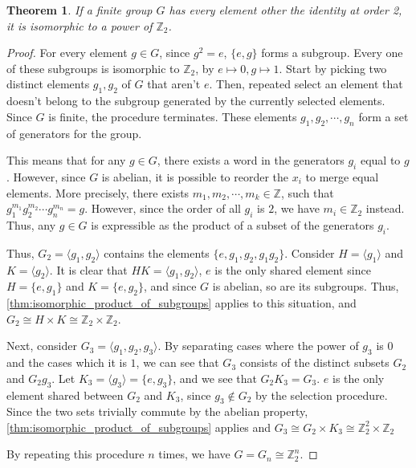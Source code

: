 \documentclass{article}
\newtheorem{theorem}{Theorem}[section]
\begin{document}
\begin{theorem}
    If a finite group $G$ has every element other the identity at order 2,
    it is isomorphic to a power of $\mathbb{Z}_2$.
\end{theorem}
\begin{proof}
    For every element $g \in G$, since $g^{2} = e$, $\{e,g\}$ forms a subgroup.
    Every one of these subgroups is isomorphic to $\mathbb{Z}_{2}$, by $e \mapsto 0, g \mapsto 1$.
    Start by picking two distinct elements $g_{1},g_{2}$ of $G$ that aren't $e$.
    Then, repeated select an element that doesn't belong to the subgroup generated by the currently selected elements.
    Since $G$ is finite, the procedure terminates.
    These elements $g_{1},g_{2},\cdots,g_n$ form a set of generators for the group. 

    This means that for any $g \in G$,
    there exists a word in the generators $g_i$ equal to $g$.
    However, since $G$ is abelian, it is possible to reorder the $x_i$ to merge equal elements.
    More precisely, there exists $m_{1},m_{2},\cdots,m_k \in \mathbb{Z}$,
    such that $g_{1}^{m_{1}}g_{2}^{m_{2}} \cdots g_{n}^{m_{n}} = g$.
    However, since the order of all $g_i$ is $2$, we have $m_i \in \mathbb{Z}_2$ instead.
    Thus, any $g \in G$ is expressible as the product of a subset of the generators $g_i$.

    Thus, $G_{2} = \langle g_{1},g_{2}\rangle$ contains the elements $\{e,g_{1},g_{2},g_{1}g_{2}\}$.
    Consider $H = \langle g_{1}\rangle$ and $K = \langle g_{2}\rangle$.
    It is clear that $HK = \langle g_{1},g_{2}\rangle$,
    $e$ is the only shared element since $H = \{e,g_{1}\}$ and $K = \{e,g_{2}\}$,
    and since $G$ is abelian, so are its subgroups.
    Thus, \autoref{thm:isomorphic_product_of_subgroups} applies to this situation, and $G_{2} \cong H \times K \cong \mathbb{Z}_2 \times \mathbb{Z}_2$.
    
    Next, consider $G_{3} = \langle g_{1},g_{2},g_{3}\rangle$.
    By separating cases where the power of $g_{3}$ is $0$ and the cases which it is $1$,
    we can see that $G_{3}$ consists of the distinct subsets $G_{2}$ and $G_{2}g_{3}$.
    Let $K_{3} = \langle g_{3}\rangle = \{e,g_{3}\}$, and we see that $G_{2}K_{3} = G_{3}$.
    $e$ is the only element shared between $G_{2}$ and $K_{3}$, since $g_{3} \notin G_{2}$ by the selection procedure.
    Since the two sets trivially commute by the abelian property,
    \autoref{thm:isomorphic_product_of_subgroups} applies and $G_{3} \cong G_{2} \times K_{3} \cong \mathbb{Z}_2^{2} \times \mathbb{Z}_2$

    By repeating this procedure $n$ times, we have $G = G_n \cong \mathbb{Z}_2^{n}$.
\end{proof}
\end{document}
